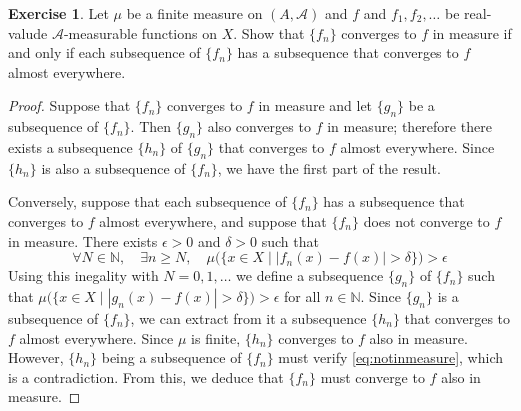 \documentclass[11pt,a4paper,twoside]{article}
\theoremstyle{definition}
\newcounter{excounter}
\newtheorem{exercise}[excounter]{Exercise}
\begin{document}
\begin{exercise}

  Let $\mu$ be a finite measure on $(A, \mathscr{A})$ and $f$ and $f_1, f_2, \dotsc$ be real-valude $\mathscr{A}$-measurable functions on $X$.
  Show that $\{ f_n \}$ converges to $f$ in measure if and only if each subsequence of $\{ f_n \}$ has a subsequence that converges to $f$ almost everywhere.

\end{exercise}

\begin{proof}\hfill

  Suppose that $\{ f_n \}$ converges to $f$ in measure and let $\{ g_n \}$ be a subsequence of $\{ f_n \}$.
  Then $\{ g_n \}$ also converges to $f$ in measure; therefore there exists a subsequence $\{ h_n \}$ of $\{ g_n \}$ that converges to $f$ almost everywhere.
  Since $\{ h_n \}$ is also a subsequence of $\{ f_n \}$, we have the first part of the result.

  Conversely, suppose that each subsequence of $\{ f_n \}$ has a subsequence that converges to $f$ almost everywhere, and suppose that $\{ f_n \}$ does not
  converge to $f$ in measure. There exists $\epsilon > 0$ and $\delta > 0$ such that
  \begin{equation}\label{eq:notinmeasure}
    \forall N \in \mathbb{N},\quad \exists n \geq N,\quad \mu \big( \{ x \in X \mid | f_n (x) - f (x) | > \delta \} \big) > \epsilon
  \end{equation}
  Using this inegality with $N = 0, 1, \dotsc$ we define a subsequence $\{ g_n \}$ of $\{ f_n \}$ such that $\mu \big( \{ x \in X \mid | g_n (x) - f (x) | > \delta \} \big) > \epsilon$
  for all $n \in \mathbb{N}$. Since $\{ g_n \}$ is a subsequence of $\{ f_n \}$, we can extract from it a subsequence $\{ h_n \}$ that converges to $f$ almost everywhere.
  Since $\mu$ is finite, $\{ h_n \}$ converges to $f$ also in measure. However, $\{ h_n \}$ being a subsequence of $\{ f_n \}$ must verify \eqref{eq:notinmeasure},
  which is a contradiction. From this, we deduce that $\{ f_n \}$ must converge to $f$ also in measure.\qedhere

\end{proof}
\end{document}
